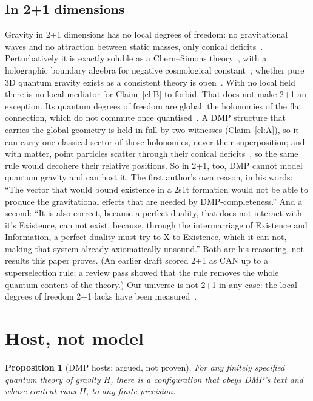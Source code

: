 \documentclass[11pt,a4paper]{article}
\newtheorem{proposition}{Proposition}
\theoremstyle{definition}
\theoremstyle{remark}
\begin{document}
\subsection{In 2+1 dimensions}\label{sec:21}
Gravity in 2+1 dimensions has no local degrees of freedom: no gravitational waves and no attraction between static masses, only conical
deficits~\cite{djt}. Perturbatively it is exactly soluble as a Chern--Simons theory~\cite{witten88}, with a holographic boundary algebra
for negative cosmological constant~\cite{bh}; whether pure 3D quantum gravity exists as a consistent theory is open~\cite{mw}. With no
local field there is no local mediator for Claim~\ref{cl:B} to forbid. That does not make 2+1 an exception. Its quantum degrees of
freedom are global: the holonomies of the flat connection, which do not commute once quantised~\cite{nr}. A DMP structure that carries
the global geometry is held in full by two witnesses (Claim~\ref{cl:A}), so it can carry one classical sector of those holonomies, never
their superposition; and with matter, point particles scatter through their conical deficits~\cite{thooft88}, so the same rule would
decohere their relative positions. So in 2+1, too, DMP cannot model quantum gravity and can host it. The first author's own reason,
in his words: ``The vector that would bound existence in a 2s1t formation would not be able to produce the gravitational effects that are
needed by DMP-completeness.'' And a second: ``It is also correct, because a perfect duality, that does not interact with it's
Existence, can not exist, because, through the intermarriage of Existence and Information, a perfect duality must try to X to Existence,
which it can not, making that system already axiomatically unsound.'' Both are his reasoning, not results this paper proves. (An earlier draft scored 2+1 as CAN up to a superselection rule; a review pass showed that the rule removes
the whole quantum content of the theory.) Our universe is not 2+1 in any case: the local degrees of freedom 2+1 lacks have been measured~\cite{ligo}.

\section{Host, not model}\label{sec:host}

\begin{proposition}[DMP hosts; argued, not proven]\label{pr:host}
For any finitely specified quantum theory of gravity $H$, there is a configuration that obeys DMP's text and whose content runs $H$, to
any finite precision.
\end{proposition}
\end{document}
